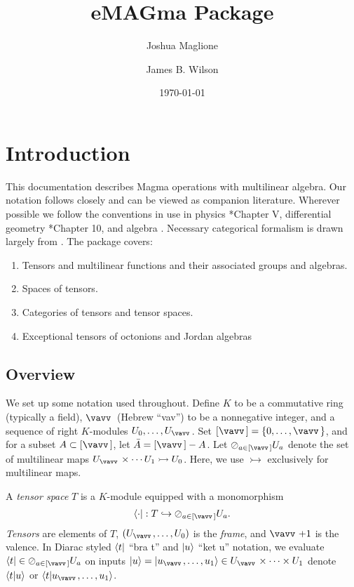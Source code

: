 \documentclass{documentation}
\title{eMAGma Package}
\author{Joshua Maglione}
\author{James B. Wilson}
\date{\today}
\begin{document}
\frontmatter

\dominitoc
\maketitle
\tableofcontents

\mainmatter

\chapter{Introduction}

This documentation describes Magma operations with multilinear algebra.
Our notation follows \cite{FMW:densors} closely and can be viewed as companion literature. 
Wherever possible we follow the conventions in use in physics \cite{Weyl}*{Chapter V}, differential geometry \cite{Lee:geom}*{Chapter 10}, and algebra \cite{Landsberg:tensors}.
Necessary categorical formalism is drawn largely from
\cite{Wilson:division}.  
The package covers:
\begin{enumerate}
\item Tensors and multilinear functions and their associated groups and algebras.
\item Spaces of tensors.
\item Categories of tensors and tensor spaces.
\item Exceptional tensors of octonions and Jordan algebras
\end{enumerate}

\section{Overview}
We set up some notation used throughout.
Define $K$ to be a commutative ring (typically a field), $\vav$ (Hebrew ``vav'') to be a nonnegative integer, and a sequence of right $K$-modules $U_0,\dots,U_{\vav}$.
Set $[\vav]=\{0,\dots,\vav\}$, and for a subset $A\subset[\vav]$, let $\comp{A}=[\vav]-A$. 
Let $\rversor_{a\in[\vav]} U_a$ denote the set of multilinear maps $U_{\vav}\times\cdots U_1\rightarrowtail U_0$. 
Here, we use $\rightarrowtail$ exclusively for multilinear maps. 

A \emph{tensor space} $T$ is a $K$-module equipped with a monomorphism 
\[ \bra{\cdot} : T \hookrightarrow \rversor_{a\in[\vav]}U_a.\]
\emph{Tensors} are elements of $T$, $(U_{\vav},\dots,U_0)$ is the \emph{frame}, and $\vav+1$ is the valence. 
In Diarac styled $\langle t|$ ``bra t'' and $| u\rangle$ ``ket u'' notation, we evaluate $\bra{t}\in\rversor_{a\in[\vav]}U_a$ on inputs $\ket{u}=\ket{u_{\vav},\dots, u_1}\in U_{\vav}\times\cdots\times U_1$ denote $\langle t|u\rangle$ or $\bra{t} u_{\vav},\dots,u_1\rangle$. 
\end{document}
